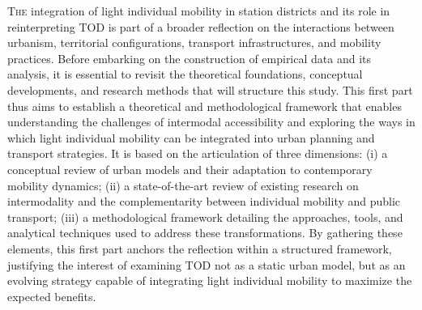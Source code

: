 \lettrine[lines=3, findent=8pt, nindent=0pt]{ T}{he} integration of light individual mobility in station districts and its role in reinterpreting \acrfull{TOD} is part of a broader reflection on the interactions between urbanism, territorial configurations, transport infrastructures, and mobility practices. Before embarking on the construction of empirical data and its analysis, it is essential to revisit the theoretical foundations, conceptual developments, and research methods that will structure this study. This first part thus aims to establish a theoretical and methodological framework that enables understanding the challenges of intermodal accessibility and exploring the ways in which light individual mobility can be integrated into urban planning and transport strategies. It is based on the articulation of three dimensions: (i) a conceptual review of urban models and their adaptation to contemporary mobility dynamics; (ii) a state-of-the-art review of existing research on intermodality and the complementarity between individual mobility and public transport; (iii) a methodological framework detailing the approaches, tools, and analytical techniques used to address these transformations. By gathering these elements, this first part anchors the reflection within a structured framework, justifying the interest of examining \acrshort{TOD} not as a static urban model, but as an evolving strategy capable of integrating light individual mobility to maximize the expected benefits.%

